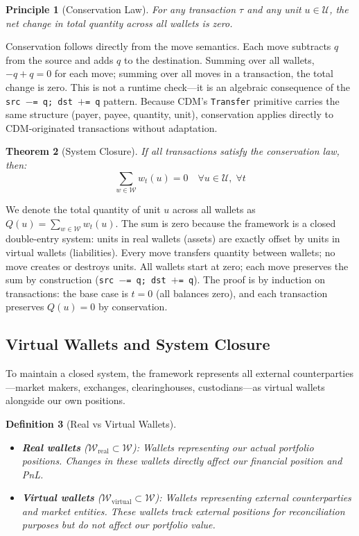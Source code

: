 \documentclass[11pt,a4paper]{article}
\newtheorem{definition}{Definition}[section]
\newtheorem{principle}[definition]{Principle}
\newtheorem{theorem}[definition]{Theorem}
\begin{document}
\begin{principle}[Conservation Law]
For any transaction $\tau$ and any unit $u \in \mathcal{U}$, the net change in total quantity across all wallets is zero.
\end{principle}

Conservation follows directly from the move semantics. Each move subtracts $q$ from the source and adds $q$ to the destination. Summing over all wallets, $-q + q = 0$ for each move; summing over all moves in a transaction, the total change is zero. This is not a runtime check---it is an algebraic consequence of the \texttt{src $-$= q; dst $+$= q} pattern. Because CDM's \texttt{Transfer} primitive carries the same structure (payer, payee, quantity, unit), conservation applies directly to CDM-originated transactions without adaptation.

\begin{theorem}[System Closure]
If all transactions satisfy the conservation law, then:
\[
\sum_{w \in \mathcal{W}} w_t(u) = 0 \quad \forall u \in \mathcal{U},\; \forall t
\]
\end{theorem}

We denote the total quantity of unit $u$ across all wallets as $Q(u) = \sum_{w \in \mathcal{W}} w_t(u)$. The sum is zero because the framework is a closed double-entry system: units in real wallets (assets) are exactly offset by units in virtual wallets (liabilities). Every move transfers quantity between wallets; no move creates or destroys units. All wallets start at zero; each move preserves the sum by construction (\texttt{src $-$= q; dst $+$= q}). The proof is by induction on transactions: the base case is $t = 0$ (all balances zero), and each transaction preserves $Q(u) = 0$ by conservation.

\subsection{Virtual Wallets and System Closure}

To maintain a closed system, the framework represents all external counterparties---market makers, exchanges, clearinghouses, custodians---as virtual wallets alongside our own positions.

\begin{definition}[Real vs Virtual Wallets]\hfill
\begin{itemize}
\item \textbf{Real wallets} ($\mathcal{W}_{\mathrm{real}} \subset \mathcal{W}$): Wallets representing our actual portfolio positions. Changes in these wallets directly affect our financial position and PnL.
\item \textbf{Virtual wallets} ($\mathcal{W}_{\mathrm{virtual}} \subset \mathcal{W}$): Wallets representing external counterparties and market entities. These wallets track external positions for reconciliation purposes but do not affect our portfolio value.
\end{itemize}
\end{definition}
\end{document}
